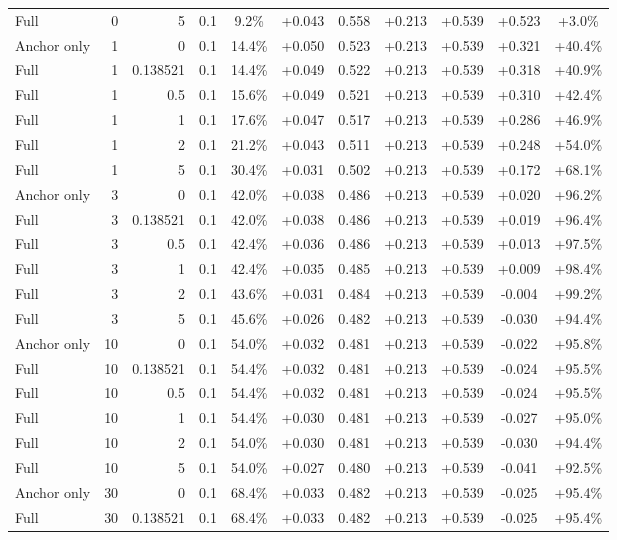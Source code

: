 \begin{table}[htbp]
\begin{tabular}{lrrrccccccc}
Full & 0 & 5 & 0.1 & 9.2\% & +0.043 & 0.558 & +0.213 & +0.539 & +0.523 & +3.0\% \\
Anchor only & 1 & 0 & 0.1 & 14.4\% & +0.050 & 0.523 & +0.213 & +0.539 & +0.321 & +40.4\% \\
Full & 1 & 0.138521 & 0.1 & 14.4\% & +0.049 & 0.522 & +0.213 & +0.539 & +0.318 & +40.9\% \\
Full & 1 & 0.5 & 0.1 & 15.6\% & +0.049 & 0.521 & +0.213 & +0.539 & +0.310 & +42.4\% \\
Full & 1 & 1 & 0.1 & 17.6\% & +0.047 & 0.517 & +0.213 & +0.539 & +0.286 & +46.9\% \\
Full & 1 & 2 & 0.1 & 21.2\% & +0.043 & 0.511 & +0.213 & +0.539 & +0.248 & +54.0\% \\
Full & 1 & 5 & 0.1 & 30.4\% & +0.031 & 0.502 & +0.213 & +0.539 & +0.172 & +68.1\% \\
Anchor only & 3 & 0 & 0.1 & 42.0\% & +0.038 & 0.486 & +0.213 & +0.539 & +0.020 & +96.2\% \\
Full & 3 & 0.138521 & 0.1 & 42.0\% & +0.038 & 0.486 & +0.213 & +0.539 & +0.019 & +96.4\% \\
Full & 3 & 0.5 & 0.1 & 42.4\% & +0.036 & 0.486 & +0.213 & +0.539 & +0.013 & +97.5\% \\
Full & 3 & 1 & 0.1 & 42.4\% & +0.035 & 0.485 & +0.213 & +0.539 & +0.009 & +98.4\% \\
Full & 3 & 2 & 0.1 & 43.6\% & +0.031 & 0.484 & +0.213 & +0.539 & -0.004 & +99.2\% \\
Full & 3 & 5 & 0.1 & 45.6\% & +0.026 & 0.482 & +0.213 & +0.539 & -0.030 & +94.4\% \\
Anchor only & 10 & 0 & 0.1 & 54.0\% & +0.032 & 0.481 & +0.213 & +0.539 & -0.022 & +95.8\% \\
Full & 10 & 0.138521 & 0.1 & 54.4\% & +0.032 & 0.481 & +0.213 & +0.539 & -0.024 & +95.5\% \\
Full & 10 & 0.5 & 0.1 & 54.4\% & +0.032 & 0.481 & +0.213 & +0.539 & -0.024 & +95.5\% \\
Full & 10 & 1 & 0.1 & 54.4\% & +0.030 & 0.481 & +0.213 & +0.539 & -0.027 & +95.0\% \\
Full & 10 & 2 & 0.1 & 54.0\% & +0.030 & 0.481 & +0.213 & +0.539 & -0.030 & +94.4\% \\
Full & 10 & 5 & 0.1 & 54.0\% & +0.027 & 0.480 & +0.213 & +0.539 & -0.041 & +92.5\% \\
Anchor only & 30 & 0 & 0.1 & 68.4\% & +0.033 & 0.482 & +0.213 & +0.539 & -0.025 & +95.4\% \\
Full & 30 & 0.138521 & 0.1 & 68.4\% & +0.033 & 0.482 & +0.213 & +0.539 & -0.025 & +95.4\% \\

\end{tabular}
\end{table}
